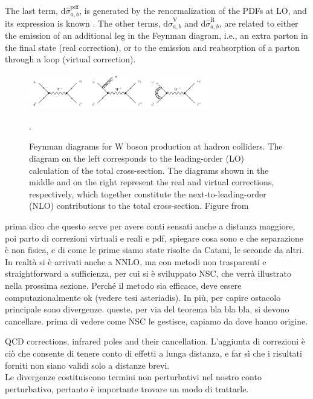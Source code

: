 \documentclass[a4paper, 12pt]{book}
\begin{document}
The last term, $\mathrm{d} \hat{\sigma}_{a,b}^{\mathrm{pdf}}$, is generated by the renormalization of the PDFs at LO, and its expression is known \cite{Catani:1996vz}. The other terms, $\mathrm{d} \hat{\sigma}_{a,b}^{\mathrm{V}}$ and $\mathrm{d} \hat{\sigma}_{a,b}^{\mathrm{R}}$, are related to either the emission of an additional leg in the Feynman diagram, i.e., an extra parton in the final state (real correction), or to the emission and reabsorption of a parton through a loop (virtual correction).
\begin{figure}[!ht]
	\centering
	\includegraphics[width=0.7\textwidth]{imgs/real-and-virtual.png}
	\caption{Feynman diagrams for W boson production at hadron colliders. The diagram on the left corresponds to the leading-order (LO) calculation of the total cross-section. The diagrams shown in the middle and on the right represent the real and virtual corrections, respectively, which together constitute the next-to-leading-order (NLO) contributions to the total cross-section. Figure from \cite{Campbell:2017}}.
	\label{hadron-collision}
\end{figure}


 \par\bigskip
prima dico che questo serve per avere conti sensati anche a distanza maggiore, poi parto di correzioni virtuali e reali e pdf, spiegare cosa sono e che separazione è non fisica, e di come le prime siamo state risolte da Catani, le seconde da altri. In realtà si è arrivati anche a NNLO, ma con metodi non trasparenti e straightforward a sufficienza, per cui si è sviluppato NSC, che verrà illustrato nella prossima sezione. Perché il metodo sia efficace, deve essere computazionalmente ok (vedere tesi asteriadis). In più, per capire ostacolo principale sono divergenze. queste, per via del teorema bla bla bla, si devono cancellare. prima di vedere come NSC le gestisce, capiamo da dove hanno origine.


QCD corrections, infrared poles and their cancellation. L'aggiunta di correzioni è ciò che consente di tenere conto di effetti a lunga distanza, e far sì che i risultati forniti non siano validi solo a distanze brevi.\\
Le divergenze costituiscono termini non perturbativi nel nostro conto perturbativo, pertanto è importante trovare un modo di trattarle.
\\
\end{document}
